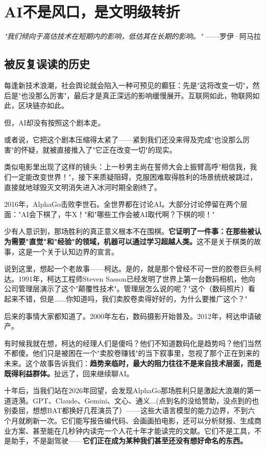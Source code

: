 

\chapter{AI不是风口，是文明级转折}


\textit{"我们倾向于高估技术在短期内的影响，低估其在长期的影响。"}
——罗伊·阿马拉


\section{被反复误读的历史}


每逢新技术浪潮，社会舆论就会陷入一种可预见的癫狂：先是"这将改变一切"，然后是"也没那么厉害"，最后才是真正深远的影响缓慢展开。互联网如此，物联网如此，区块链亦如此。

但，AI却没有按照这个剧本走。

或者说，它把这个剧本压缩得太紧了——紧到我们还没来得及完成"也没那么厉害"的怀疑，就被直接推入了"它正在改变一切"的现实。

类似电影里出现了这样的镜头：上一秒男主尚在誓师大会上振臂高呼"相信我，我们一定能改变世界！"，接下来质疑阻碍，克服困难取得胜利的场景统统被跳过，直接就地球毁灭文明消失进入冰河时期全剧终了。

2016年，AlphaGo击败李世石。全世界都在讨论AI。大部分讨论停留在两个层面："AI会下棋了，牛X！"和"哪些工作会被AI取代啊？下棋的呗！"

少有人意识到，那场胜利的真正意义根本不在围棋。\textbf{它证明了一件事：在那些被认为需要"直觉"和"经验"的领域，机器可以通过学习超越人类。}这不是关于棋类的故事，这是一个关于认知边界的宣言。

说到这里，想起一个老故事——柯达。是的，就是那个曾经不可一世的胶卷巨头柯达。1991年，柯达工程师Steven Sasson已经发明了世界上第一台数码相机，他向公司管理层演示了这个"颠覆性技术"。管理层怎么说的呢？"这个（数码照片）看起来不错，但是......你知道吗，我们卖胶卷卖得好好的，为什么要推广这个？" 

后来的事情大家都知道了。2000年左右，数码摄影开始普及。2012年，柯达申请破产。

有时候我就在想，柯达的经理人们是傻吗？他们不知道数码化是趋势吗？他们当然不都傻。他们只是被困在一个"卖胶卷赚钱"的当下叙事里，忽视了那个正在到来的未来。这个故事告诉我们：\textbf{趋势来临时，最大的阻力往往不是来自技术层面，而是既得利益群体。}扯远了，回来继续聊AI。

十年后，当我们站在2026年回望，会发现AlphaGo那场胜利只是激起大浪潮的第一道涟漪。GPT、Claude、Gemini、文心、通义...(点到名的没给赞助，没点到的也别委屈，想想BAT都换好几茬演员了）——这些大语言模型的能力边界，不到六个月就刷新一次。它们能写报告编代码、会画画拍电影，还可以分析财报、生成商业方案、甚至能在几秒钟内读完一个人花十年才能读完的文献。它们不是工具，不是助手，不是副驾驶——\textbf{它们正在成为某种我们甚至还没有想好命名的东西。}

